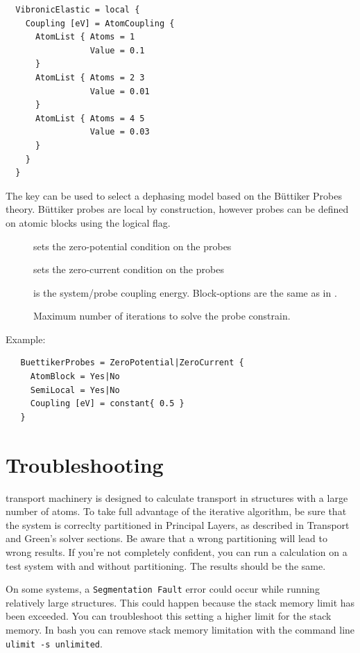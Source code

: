   \begin{verbatim}
  VibronicElastic = local { 
    Coupling [eV] = AtomCoupling { 
      AtomList { Atoms = 1
                 Value = 0.1
      } 
      AtomList { Atoms = 2 3
                 Value = 0.01
      }           
      AtomList { Atoms = 4 5
                 Value = 0.03
      }
    }
  }
  \end{verbatim}


The  key can be used to select a dephasing model based on the B\"uttiker Probes theory.
B\"uttiker probes are local by construction, however probes can be defined on atomic blocks using 
the  logical flag.

\begin{description}
  \item[] sets the zero-potential condition on the probes 
  \item[] sets the zero-current condition on the probes 
  \item[] is the system/probe coupling energy. Block-options are the same as
	  in .
  \item[] Maximum number of iterations to solve the probe constrain.	  
\end{description}

Example:
   \begin{verbatim}
   BuettikerProbes = ZeroPotential|ZeroCurrent {
     AtomBlock = Yes|No
     SemiLocal = Yes|No
     Coupling [eV] = constant{ 0.5 }
   }
   \end{verbatim}

\section{Troubleshooting}

\dftbp{} transport machinery is designed to calculate transport in structures
with a large number of atoms. To take full advantage of the iterative algorithm,
be sure that the system is correclty partitioned in Principal Layers, as
described in Transport and Green's solver sections. Be aware that a wrong
partitioning will lead to wrong results. If you're not completely confident, you
can run a calculation on a test system with and without partitioning. The
results should be the same.

On some systems, a \verb|Segmentation Fault| error could occur while running
relatively large structures. This could happen because the stack memory limit
has been exceeded. You can troubleshoot this setting a higher limit for the
stack memory. In bash you can remove stack memory limitation with the command
line \verb|ulimit -s unlimited|.
